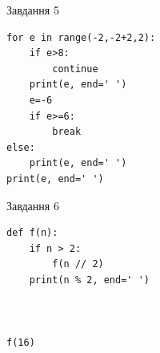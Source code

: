 \documentclass[12pt, ukrainian]{article}
\begin{document}
{\vspace{15mm}
\begin{minipage}[t]{9.7cm}                
{\begin{center}Завдання {5}\end{center}}
\begin{verbatim}
for e in range(-2,-2+2,2):
    if e>8:
        continue
    print(e, end=' ')
    e=-6
    if e>=6:
        break
else:
    print(e, end=' ')
print(e, end=' ')
\end{verbatim}     
\end{minipage}
\vline \hspace{8mm}
\begin{minipage}[t]{8.0cm}                
{\begin{center}Завдання {6}\end{center}}
\begin{verbatim}
def f(n):
    if n > 2:
        f(n // 2)
    print(n % 2, end=' ')
    


f(16)
\end{verbatim}     
\end{minipage}

}
\newpage
\end{document}
